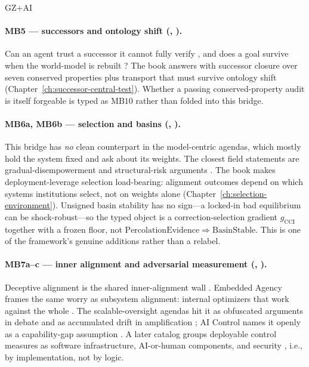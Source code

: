 \begin{authbar}{GZ+AI}
\paragraph{MB5 --- successors and ontology shift (, ).}
Can an agent trust a successor it cannot fully verify \autocite{yudkowsky2013tiling,fallenstein2015vingean}, and does a goal survive when the world-model is rebuilt \autocite{deblanc2011ontological}?
The book answers with successor closure over seven conserved properties plus transport that must survive ontology shift (Chapter~\ref{ch:successor-central-test}).
Whether a passing conserved-property audit is itself forgeable is typed as \(\text{MB10}\) rather than folded into this bridge.

\paragraph{MB6a, MB6b --- selection and basins (, ).}
This bridge has \emph{no} clean counterpart in the model-centric agendas, which mostly hold the system fixed and ask about its weights.
The closest field statements are gradual-disempowerment and structural-risk arguments \autocite{kulveit2025gradualdisempowerment,christiano2019failure,critch2020ai}.
The book makes deployment-leverage selection load-bearing: alignment outcomes depend on which systems institutions select, not on weights alone (Chapter~\ref{ch:selection-environment}).
Unsigned basin stability has no sign---a locked-in bad equilibrium can be shock-robust---so the typed object is a correction-selection gradient \(g_{\mathrm{CCI}}\) together with a frozen floor, not \(\mathrm{PercolationEvidence}\Rightarrow\mathrm{BasinStable}\).
This is one of the framework's genuine additions rather than a relabel.

\paragraph{MB7a--c --- inner alignment and adversarial measurement (, ).}
Deceptive alignment is the shared inner-alignment wall \autocite{hubinger2019risks,hubinger2023modelorganisms,park2024deception}.
Embedded Agency frames the same worry as subsystem alignment: internal optimizers that work against the whole \autocite{demski2019embedded}.
The scalable-oversight agendas hit it as obfuscated arguments in debate \autocite{irving2018debate} and as accumulated drift in amplification \autocite{christiano2018amplifying,leike2018scalable}; AI Control names it openly as a capability-gap assumption \autocite{shlegeris2023aicontrol}.
A later catalog groups deployable control measures as software infrastructure, AI-or-human components, and security \autocite{greenblatt2025controloverview}, i.e., by implementation, not by logic.


\end{authbar}
